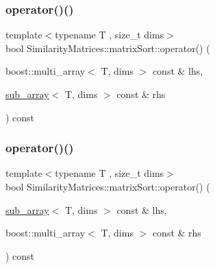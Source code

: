 \mbox{\label{struct_similarity_matrices_1_1matrix_sort_ace2f6acabe2ccd150430fbcfdeb68aad}} 
\subsubsection{\texorpdfstring{operator()()}{operator()()}\hspace{0.1cm}{\footnotesize\ttfamily [2/4]}}
{\footnotesize\ttfamily template$<$typename T , size\+\_\+t dims$>$ \\
bool Similarity\+Matrices\+::matrix\+Sort\+::operator() (\begin{DoxyParamCaption}\item[{boost\+::multi\+\_\+array$<$ T, dims $>$ const \&}]{lhs,  }\item[{\mbox{\hyperlink{struct_similarity_matrices_1_1matrix_sort_ae39e66ff77c02f615725350ab7d68f71}{sub\+\_\+array}}$<$ T, dims $>$ const \&}]{rhs }\end{DoxyParamCaption}) const\hspace{0.3cm}{\ttfamily [inline]}}

\mbox{\label{struct_similarity_matrices_1_1matrix_sort_ae81fac7e6ef133ae6fa3d6c08969ff76}} 
\subsubsection{\texorpdfstring{operator()()}{operator()()}\hspace{0.1cm}{\footnotesize\ttfamily [3/4]}}
{\footnotesize\ttfamily template$<$typename T , size\+\_\+t dims$>$ \\
bool Similarity\+Matrices\+::matrix\+Sort\+::operator() (\begin{DoxyParamCaption}\item[{\mbox{\hyperlink{struct_similarity_matrices_1_1matrix_sort_ae39e66ff77c02f615725350ab7d68f71}{sub\+\_\+array}}$<$ T, dims $>$ const \&}]{lhs,  }\item[{boost\+::multi\+\_\+array$<$ T, dims $>$ const \&}]{rhs }\end{DoxyParamCaption}) const\hspace{0.3cm}{\ttfamily [inline]}}

